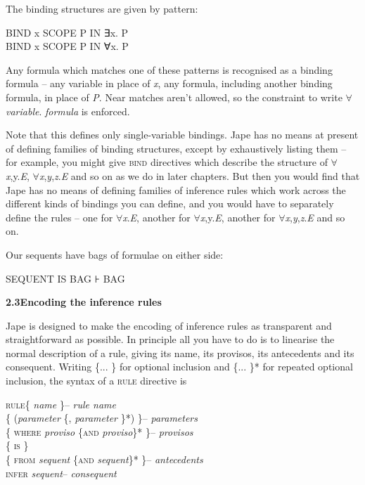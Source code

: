 \documentclass[11pt]{book}
\newcommand{\tab}{\hspace{5mm}}
\begin{document}
The binding structures are given by pattern:

BIND x SCOPE P IN ∃x. P\\
BIND x SCOPE P IN ∀x. P


Any formula which matches one of these patterns is recognised as a binding formula -- any variable in place of \textit{x}, any formula, including another binding formula, in place of \textit{P}. Near matches aren't allowed, so the constraint to write \ensuremath{\forall} \textit{variable}. \textit{formula} is enforced.


Note that this defines only single-variable bindings. Jape has no means at present of defining families of binding structures, except by exhaustively listing them -- for example, you might give \textsc{bind} directives which describe the structure of \ensuremath{\forall}\textit{x},y.\textit{E}, \ensuremath{\forall}\textit{x},\textit{y},\textit{z}.\textit{E} and so on as we do in later chapters. But then you would find that Jape has no means of defining families of inference rules which work across the different kinds of bindings you can define, and you would have to separately define the rules -- one for \ensuremath{\forall}\textit{x}.\textit{E}, another for \ensuremath{\forall}\textit{x},y.\textit{E}, another for \ensuremath{\forall}\textit{x},\textit{y},\textit{z}.\textit{E} and so on.


Our sequents have bags of formulae on either side:

SEQUENT IS BAG ⊦ BAG


\textbf{{\large 2.3\tab Encoding the inference rules}}


Jape is designed to make the encoding of inference rules as transparent and straightforward as possible. In principle all you have to do is to linearise the normal description of a rule, giving its name, its provisos, its antecedents and its consequent. Writing \{... \} for optional inclusion and \{... \}* for repeated optional inclusion, the syntax of a \textsc{rule} directive is

\textsc{rule}\tab \{ \textit{name} \}\tab -- \textit{rule name}\\
\tab \{ (\textit{parameter} \{, \textit{parameter} \}*) \}\tab -- \textit{parameters}\\
\tab \{ \textsc{where} \textit{proviso} \{\textsc{and} \textit{proviso}\}* \}\tab -- \textit{provisos}\\
\tab \{ \textsc{is} \}\\
\tab \{ \textsc{from} \textit{sequent} \{\textsc{and} \textit{sequent}\}* \}\tab -- \textit{antecedents}\\
\tab \textsc{infer} \textit{sequent}\tab -- \textit{consequent}
\end{document}
